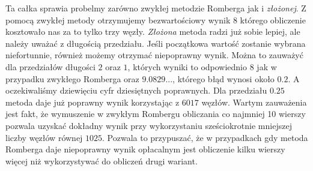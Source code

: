\documentclass[11pt,leqno]{article}
\begin{document}
Ta całka sprawia probelmy zarówno zwykłej metodzie Romberga jak i
\textit{złożonej}. Z pomocą zwykłej metody otrzymujemy bezwartościowy wynik
$8$ którego obliczenie kosztowało nas za to tylko trzy węzły. \textit{Złożona}
metoda radzi już sobie lepiej, ale należy uważać z długością przedziału. Jeśli
początkowa wartość zostanie wybrana niefortunnie, również możemy otrzymać
niepoprawny wynik. Można to zauważyć dla przedziałów długości $2$ oraz $1$,
których wyniki to odpowiednio $8$ jak w przypadku zwykłego Romberga oraz
$9.0829...$, którego błąd wynosi około $0.2$. A oczekiwaliśmy dziewięciu
cyfr dziesiętnych poprawnych. Dla przedziału $0.25$ metoda daje już poprawny
wynik korzystając z $6017$ węzłów. Wartym zauważenia jest fakt, że wymuszenie
w zwykłym Rombergu obliczania co najmniej 10 wierszy pozwala uzyskać dokładny
wynik przy wykorzystaniu sześciokrotnie mniejszej liczby węzłów równej $1025$.
Pozwala to przypuszać, że w przypadkach gdy metoda Romberga daje niepoprawny
wynik opłacalnym jest obliczenie kilku wierszy więcej niż wykorzystywać do
obliczeń drugi wariant.
\end{document}
